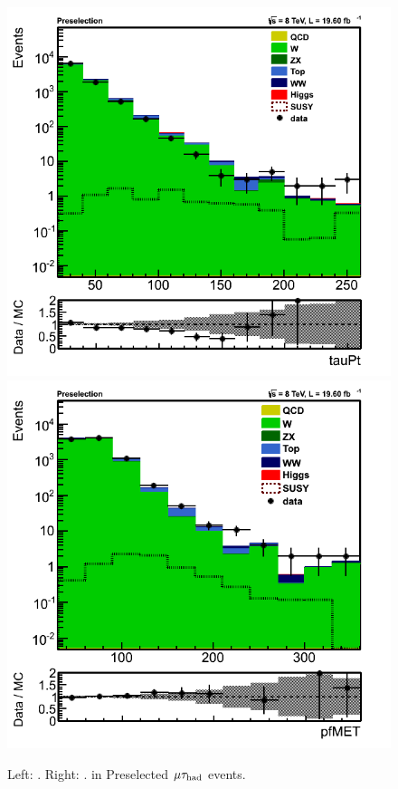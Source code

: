 \begin{figure}[htbp]
\centering
\includegraphics[angle=0,scale=0.35]{SelectionMuTau/tauPt_muTau.png}
\includegraphics[angle=0,scale=0.35]{SelectionMuTau/pfMET_muTau.png}
\caption{Left: \Tau\PT. Right: \MET. in Preselected $\mu\tau_{\rm had}$ events.}
\label{fig:datamcmuotau}
\end{figure}

